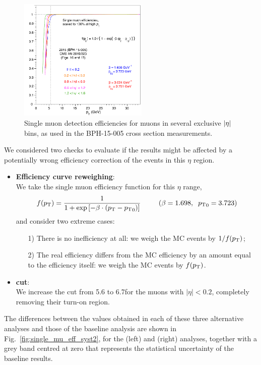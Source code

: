 \begin{figure}[h]
\centering
\includegraphics[width=0.55\textwidth]{Figures/chapter6/single_mu_effs_2015.pdf}
\caption{Single muon detection efficiencies for muons in several exclusive 
$\abs{\eta}$ bins, as used in the BPH-15-005 cross section measurements.}
\label{fig:single_mu_eff_syst1}
\end{figure}

We considered two checks to evaluate if the results might be affected 
by a potentially wrong efficiency correction of the events in this $\eta$ region.
\begin{itemize}
\item \textbf{Efficiency curve reweighing}:\\
We take the single muon efficiency function for this $\eta$ range,
$$f(p_\text{T}) = \frac{1}{1+\exp\left[-\beta \cdot \left(p_\text{T}-{p_\text{T}}_0 \right) \right]}
\hspace{0.9cm}(\beta=1.698,\hspace{0.2cm}{\ensuremath{p_\text{T}}}_0=3.723)$$
and consider two extreme cases: 
\begin{enumerate}
\item[1)] There is no inefficiency at all: we weigh the MC events by $1/f(p_\text{T})$;
\item[2)] The real efficiency differs from the MC efficiency by an amount equal to the efficiency itself: 
we weigh the MC events by $f(p_\text{T})$.
\end{enumerate} 
\item \textbf{\pt cut}:\\ 
We increase the \pt cut from 5.6 to 6.7\GeV for the muons with $|\eta| < 0.2$, 
completely removing their turn-on region.
\end{itemize} 


The differences between the \lth values obtained in each of these three alternative analyses 
and those of the baseline analysis are shown in Fig.~\ref{fig:single_mu_eff_syst2},
for the \jpsi (left) and \psip (right) analyses,
together with a grey band centred at zero that represents 
the statistical uncertainty of the baseline results.

